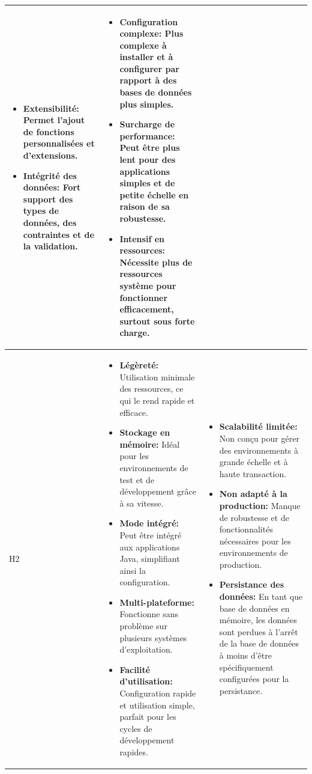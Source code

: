 \documentclass[12pt]{report}
\begin{document}
\begin{longtable}{|p{3cm}|p{5.5cm}|p{5.5cm}|}
\begin{itemize}
							\item \textbf{Extensibilité:} Permet l'ajout de fonctions personnalisées et d'extensions.
							\item \textbf{Intégrité des données:} Fort support des types de données, des contraintes et de la validation.
						\end{itemize} &
						\begin{itemize}
							\item \textbf{Configuration complexe:} Plus complexe à installer et à configurer par rapport à des bases de données plus simples.
							\item \textbf{Surcharge de performance:} Peut être plus lent pour des applications simples et de petite échelle en raison de sa robustesse.
							\item \textbf{Intensif en ressources:} Nécessite plus de ressources système pour fonctionner efficacement, surtout sous forte charge.
						\end{itemize} \\
						\hline
						H2&
						\begin{itemize}
							\item \textbf{Légèreté:} Utilisation minimale des ressources, ce qui le rend rapide et efficace. 	
							\item \textbf{Stockage en mémoire:} Idéal pour les environnements de test et de développement grâce à sa vitesse.
							\item \textbf{Mode intégré:} Peut être intégré aux applications Java, simplifiant ainsi la configuration.
							\item \textbf{Multi-plateforme:} Fonctionne sans problème sur plusieurs systèmes d'exploitation.
							\item \textbf{Facilité d'utilisation:} Configuration rapide et utilisation simple, parfait pour les cycles de développement rapides.
						\end{itemize}
						&
						\begin{itemize}
							\item \textbf{Scalabilité limitée:} Non conçu pour gérer des environnements à grande échelle et à haute transaction.
							\item \textbf{Non adapté à la production:} Manque de robustesse et de fonctionnalités nécessaires pour les environnements de production.
							\item \textbf{Persistance des données:} En tant que base de données en mémoire, les données sont perdues à l'arrêt de la base de données à moins d'être spécifiquement configurées pour la persistance.
						\end{itemize}\\
						\hline
				    \end{longtable}
\end{document}
